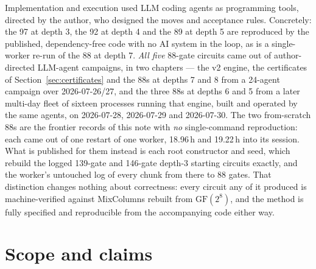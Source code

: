 \documentclass[11pt,a4paper]{article}
\begin{document}
Implementation and execution used LLM coding agents as programming tools,
directed by the author, who designed the moves and acceptance rules. Concretely:
the 97 at depth 3, the 92 at depth 4 and the 89 at depth 5 are reproduced by the
published, dependency-free code with no AI system in the loop, as is a
single-worker re-run of the 88 at depth 7. \emph{All five} 88-gate circuits came
out of author-directed LLM-agent campaigns, in two chapters --- the v2 engine,
the certificates of Section~\ref{sec:certificates} and the 88s at depths 7 and 8
from a 24-agent campaign over 2026-07-26/27, and the three 88s at depths 6 and 5
from a later multi-day fleet of sixteen processes running that engine,
built and operated by the same agents, on 2026-07-28, 2026-07-29 and
2026-07-30. The two from-scratch 88s are the frontier records of this note with
\emph{no} single-command reproduction: each came out of one restart of one
worker, 18.96\,h and 19.22\,h into its session. What is published for them
instead is each root constructor and seed, which rebuild the logged 139-gate and
146-gate depth-3 starting circuits exactly, and the worker's untouched log of
every chunk from there to 88 gates.
That distinction changes nothing about correctness: every circuit any of it
produced is machine-verified against MixColumns rebuilt from
$\mathrm{GF}(2^8)$, and the method is fully specified and reproducible from the
accompanying code either way.

\section{Scope and claims}
\end{document}
